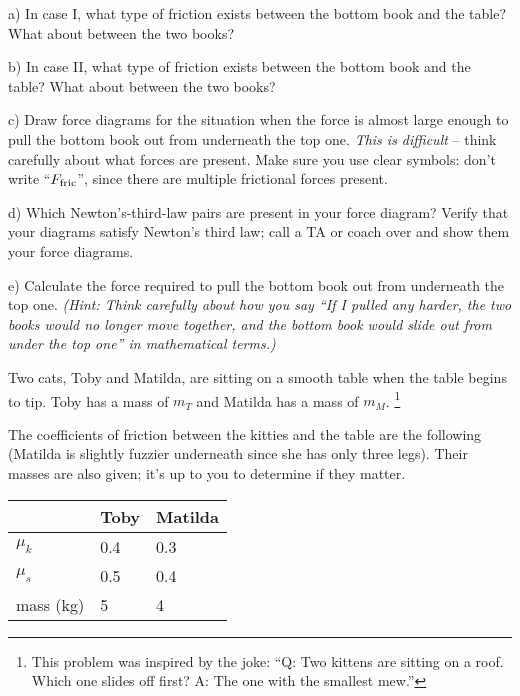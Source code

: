 \documentclass[12pt]{article}
\begin{document}
		a) In case I, what type of friction exists between the bottom book and the table? What about between the two books?
		
		\vspace{0.5in}
		
		b) In case II, what type of friction exists between the bottom book and the table? What about between the two books?
		
		\vspace{0.5in}
		
		c) Draw force diagrams for the situation when the force is almost large enough to pull the bottom book out from underneath the top one. {\it This is difficult} -- think carefully about what forces are present. Make sure you use clear symbols: don't write ``$F_{\rm fric}$'', since there are multiple frictional forces present.
		
		\vspace{2.3in}
		
		d) Which Newton's-third-law pairs are present in your force diagram? Verify that your diagrams satisfy Newton's third law; call a TA or coach over and show them your force diagrams.
		
		\newpage
		
		e) Calculate the force required to pull the bottom book out from underneath the top one. {\it (Hint: Think carefully about how you say ``If I pulled any harder, the two books would no longer move together, and the bottom book would slide out from under the top one'' in mathematical terms.)}
		
		\newpage
		
		Two cats, Toby and Matilda, are sitting on a smooth table when the table begins to tip. Toby has a mass of $m_T$ and Matilda has a mass of $m_M$. \footnote{This problem was inspired by the joke: ``Q: Two kittens are sitting on a roof. Which one slides off first? A: The one with the smallest mew.''}
		
		\begin{minipage}{0.6\textwidth}
			The coefficients of friction between the kitties and the table are the following (Matilda is slightly fuzzier underneath since she has only three legs). Their masses are also
			given; it's up to you to determine if they matter.
		\end{minipage}\hspace{0.1\textwidth}
		\begin{minipage}{0.3\textwidth}
			\begin{tabular}{|l|l|l|}
				\hline
				& Toby & Matilda \\ \hline
				$\mu_k$ & 0.4  & 0.3  \\ \hline
				$\mu_s$ & 0.5  & 0.4  \\ \hline
				mass (kg) & 5 & 4 \\ \hline
			\end{tabular}
		\end{minipage}
		
\end{document}
